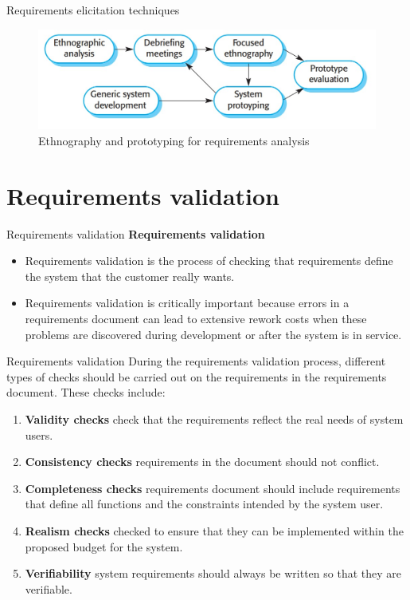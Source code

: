 \documentclass{beamer}
\begin{document}
\begin{frame}{Requirements elicitation techniques}
\begin{figure}
	\includegraphics[scale=.45]{img/m2_7.jpg}
	\caption{Ethnography 
		and prototyping for 
		requirements analysis}
\end{figure}

\end{frame}


\section{Requirements validation}
\begin{frame}{Requirements validation}
	\textbf{Requirements validation}
	\begin{itemize}
		\item Requirements validation is the process of checking that requirements define the system      that the customer really wants.
		\item Requirements validation is critically important because errors in a requirements document  can lead to extensive rework costs when these problems are discovered during development or after the system is in service.
	\end{itemize}
\end{frame}
\begin{frame}{Requirements validation}
	During the requirements validation process, different types of checks should be carried out on  the requirements in the requirements document. These checks include:
	\begin{enumerate}
		\item \textbf{Validity checks} check that the requirements reflect the real needs of system users.
		\item \textbf{Consistency checks} requirements in the document should not conflict. 
		\item \textbf{Completeness checks} requirements document should include requirements that define all functions and the constraints intended by the	system user.

		\item \textbf{Realism checks} checked to ensure that they can be implemented within the proposed budget for the system.
		\item \textbf{Verifiability} system requirements should always be written so that they are verifiable.
		
	\end{enumerate}
\end{frame}
\end{document}
